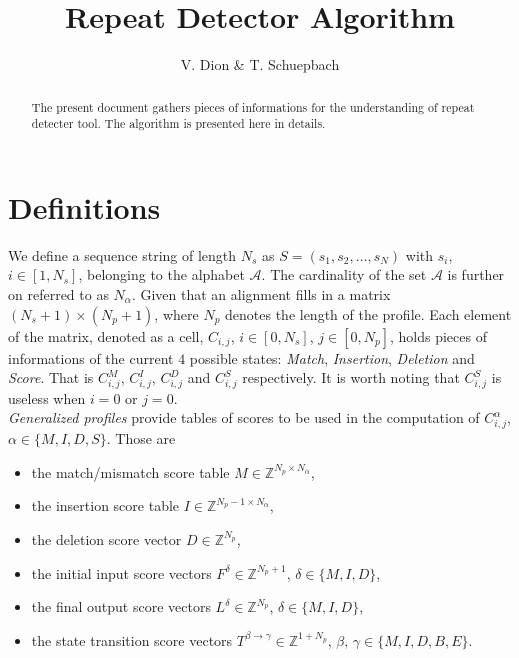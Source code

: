 \documentclass[a4paper,10pt,twoside]{scrartcl}
\title{Repeat Detector Algorithm}
\author{V. Dion \& T. Schuepbach}
\newcommand{\A}{\mathcal{A}}
\begin{document}
 \renewcommand{\headheight}{30.0pt}
 \fancyhead{} %
 \fancyfoot[LE,RO]{\thepage}
 \renewcommand{\headrulewidth}{0.4pt}
 \renewcommand{\footrulewidth}{0.4pt}
 
\maketitle

\begin{abstract}
  The present document gathers pieces of informations for the understanding of repeat detecter tool.
  The algorithm is presented here in details.
  \tableofcontents
\end{abstract}
\newpage

\section*{Definitions}
We define a sequence string of length $N_s$ as $S = \left ( s_1, s_2, \ldots, s_N \right )$ with
$s_i$, $i \in [1,N_s]$, belonging to the alphabet $\A$. The cardinality of the set $\A$ is further on  referred to as $N_\alpha$.
Given that an alignment fills in a matrix $(N_s+1) \times (N_p+1)$, where $N_p$ denotes the length of the profile.
Each element of the matrix, denoted as a cell, $C_{i,j}$, $i \in [0,N_s]$, $j \in [0,N_p]$, holds pieces of informations of the current
$4$ possible states: \emph{Match}, \emph{Insertion}, \emph{Deletion} and \emph{Score}. That is $C_{i,j}^{M}$,
$C_{i,j}^{I}$, $C_{i,j}^{D}$ and $C_{i,j}^{S}$ respectively. It is worth noting that $C_{i,j}^{S}$ is useless when $i=0$ or $j=0$.\\
\emph{Generalized profiles} provide tables of scores to be used in the computation of $C^{\alpha}_{i,j}$, $\alpha \in \{M,I,D,S\}$.
Those are 
\begin{itemize}
  \item the match/mismatch score table $M \in \mathbb{Z}^{N_p \times N_\alpha}$,
  \item the insertion score table $I \in \mathbb{Z}^{N_p-1 \times N_\alpha}$,
  \item the deletion score vector $D \in \mathbb{Z}^{N_p}$, 
  \item the initial input score vectors $F^{\delta} \in \mathbb{Z}^{N_p+1}$, $\delta\in \{M,I,D\}$,
  \item the final output score vectors $L^{\delta} \in \mathbb{Z}^{N_p}$, $\delta\in \{M,I,D\}$,
  \item the state transition score vectors $T^{\beta \rightarrow \gamma} \in \mathbb{Z}^{1+N_p}$, $\beta,\,\gamma \in \{M,I,D,B,E\}$.
\end{itemize}
\end{document}
